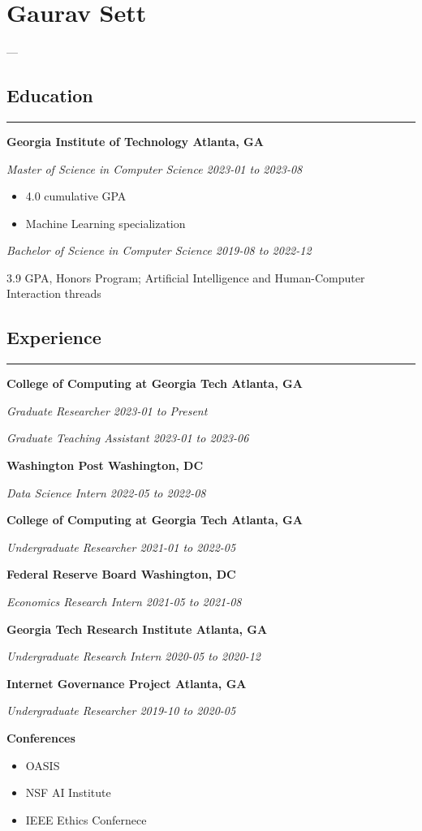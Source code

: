 \documentclass[10pt]{article}
\newcommand{\headingOne}[1]{
    \subsection*{#1} \hrule
    \vspace*{6pt}
}
\newcommand{\headingTwo}[2]{
    \vspace*{6pt}
    \textbf{#1 \hfill #2}
}
\newcommand{\headingThree}[2]{
    \vspace*{2pt}
    \textsl{#1 \hfill #2}
}
\begin{document}
\section*{Gaurav Sett}

—


\headingOne{Education}


\headingTwo{Georgia Institute of Technology}{Atlanta, GA}

\headingThree{Master of Science in Computer Science}{2023-01 to 2023-08}
\begin{itemize}
    \item 4.0 cumulative GPA
    \item Machine Learning specialization
\end{itemize}

\headingThree{Bachelor of Science in Computer Science}{2019-08 to 2022-12}

3.9 GPA, Honors Program; Artificial Intelligence and Human-Computer Interaction threads


\headingOne{Experience}


\headingTwo{College of Computing at Georgia Tech}{Atlanta, GA}

\headingThree{Graduate Researcher}{2023-01 to Present}

\headingThree{Graduate Teaching Assistant}{2023-01 to 2023-06}


\headingTwo{Washington Post}{Washington, DC}

\headingThree{Data Science Intern}{2022-05 to 2022-08}


\headingTwo{College of Computing at Georgia Tech}{Atlanta, GA}

\headingThree{Undergraduate Researcher}{2021-01 to 2022-05}


\headingTwo{Federal Reserve Board}{Washington, DC}

\headingThree{Economics Research Intern}{2021-05 to 2021-08}


\headingTwo{Georgia Tech Research Institute}{Atlanta, GA}

\headingThree{Undergraduate Research Intern}{2020-05 to 2020-12}


\headingTwo{Internet Governance Project}{Atlanta, GA}

\headingThree{Undergraduate Researcher}{2019-10 to 2020-05}


\headingTwo{Conferences}{}
\begin{itemize}
    \item  OASIS
    \item NSF AI Institute
    \item IEEE Ethics Confernece
\end{itemize}
\end{document}
